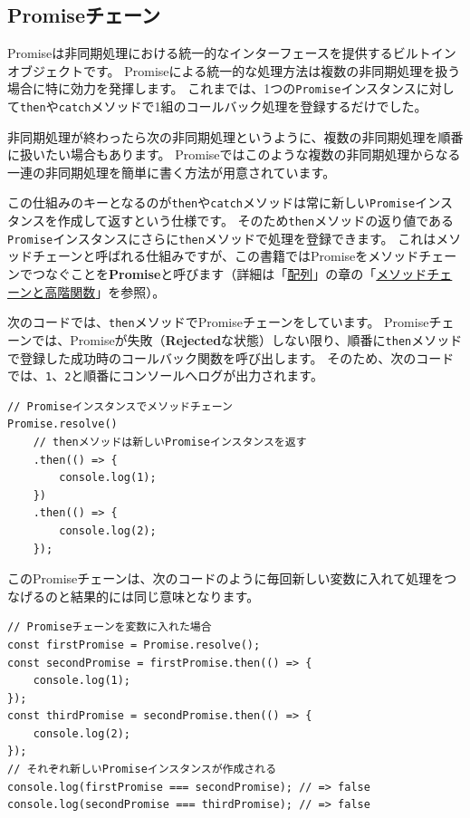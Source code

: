\hypertarget{promise-chain}{%
\subsection{Promiseチェーン}\label{promise-chain}}

Promiseは非同期処理における統一的なインターフェースを提供するビルトインオブジェクトです。
Promiseによる統一的な処理方法は複数の非同期処理を扱う場合に特に効力を発揮します。
これまでは、1つの\texttt{Promise}インスタンスに対して\texttt{then}や\texttt{catch}メソッドで1組のコールバック処理を登録するだけでした。

非同期処理が終わったら次の非同期処理というように、複数の非同期処理を順番に扱いたい場合もあります。
Promiseではこのような複数の非同期処理からなる一連の非同期処理を簡単に書く方法が用意されています。

この仕組みのキーとなるのが\texttt{then}や\texttt{catch}メソッドは常に新しい\texttt{Promise}インスタンスを作成して返すという仕様です。
そのため\texttt{then}メソッドの返り値である\texttt{Promise}インスタンスにさらに\texttt{then}メソッドで処理を登録できます。
これはメソッドチェーンと呼ばれる仕組みですが、この書籍ではPromiseをメソッドチェーンでつなぐことを\textbf{Promise}と呼びます（詳細は「\hyperlink{array}{配列}」の章の「\hyperlink{method-chain-and-high-order-function}{メソッドチェーンと高階関数}」を参照）。

次のコードでは、\texttt{then}メソッドでPromiseチェーンをしています。
Promiseチェーンでは、Promiseが失敗（\textbf{Rejected}な状態）しない限り、順番に\texttt{then}メソッドで登録した成功時のコールバック関数を呼び出します。
そのため、次のコードでは、\texttt{1}、\texttt{2}と順番にコンソールへログが出力されます。

\begin{lstlisting}
// Promiseインスタンスでメソッドチェーン
Promise.resolve()
    // thenメソッドは新しいPromiseインスタンスを返す
    .then(() => {
        console.log(1);
    })
    .then(() => {
        console.log(2);
    });
\end{lstlisting}

このPromiseチェーンは、次のコードのように毎回新しい変数に入れて処理をつなげるのと結果的には同じ意味となります。

\begin{lstlisting}
// Promiseチェーンを変数に入れた場合
const firstPromise = Promise.resolve();
const secondPromise = firstPromise.then(() => {
    console.log(1);
});
const thirdPromise = secondPromise.then(() => {
    console.log(2);
});
// それぞれ新しいPromiseインスタンスが作成される
console.log(firstPromise === secondPromise); // => false
console.log(secondPromise === thirdPromise); // => false
\end{lstlisting}

